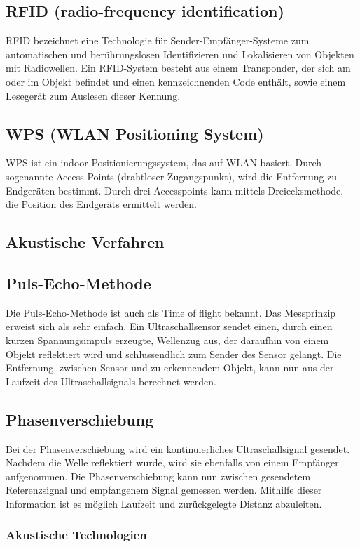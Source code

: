     \subsection*{RFID (radio-frequency identification)}
    RFID bezeichnet eine Technologie für Sender-Empfänger-Systeme zum automatischen und berührungslosen Identifizieren und Lokalisieren von Objekten mit Radiowellen. Ein RFID-System besteht aus einem Transponder, der sich am oder im Objekt befindet und einen kennzeichnenden Code enthält, sowie einem Lesegerät zum Auslesen dieser Kennung.
    \subsection*{WPS (WLAN Positioning System)}
    WPS ist ein indoor Positionierungssystem, das auf WLAN basiert. Durch sogenannte  Access Points (drahtloser Zugangspunkt), wird die Entfernung zu Endgeräten bestimmt. Durch drei Accesspoints kann mittels Dreiecksmethode, die Position des Endgeräts ermittelt werden.

    \subsection{Akustische Verfahren}
    \subsection*{Puls-Echo-Methode}
    Die Puls-Echo-Methode ist auch als Time of flight bekannt.
    Das Messprinzip erweist sich als sehr einfach. Ein Ultraschallsensor sendet einen, durch einen kurzen Spannungsimpuls erzeugte, Wellenzug aus, der daraufhin von einem Objekt reflektiert wird und schlussendlich zum Sender des Sensor gelangt. Die Entfernung, zwischen Sensor und zu erkennendem Objekt, kann nun aus der Laufzeit des Ultraschallsignals berechnet werden. \cite{akustischeverfahren}
    \subsection*{Phasenverschiebung}
    Bei der Phasenverschiebung wird ein kontinuierliches Ultraschallsignal gesendet. Nachdem die Welle reflektiert wurde, wird sie ebenfalls von einem Empfänger aufgenommen. Die Phasenverschiebung kann nun zwischen gesendetem Referenzsignal und empfangenem Signal gemessen werden. Mithilfe dieser Information ist es möglich Laufzeit und zurückgelegte Distanz abzuleiten. \cite{akustischeverfahren}

    \subsubsection{Akustische Technologien}
